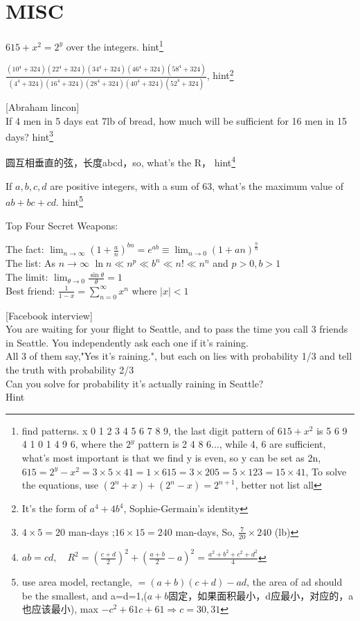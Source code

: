 \documentclass[math.tex]{subfiles}
\begin{document}
\section{MISC}

\dotfill
$615+x^2=2^y$ over the integers.  hint\footnote{find patterns. x 0 1 2 3 4 5 6 7 8 9, the last digit pattern of $615+x^2$ is 5 6 9 4 1 0 1 4 9 6, where the $2^y$ pattern is 2 4 8 6..., while 4, 6 are sufficient, what's most important is that we find y is even, so y can be set as 2n, $615=2^y-x^2=3\times 5 \times 41=1\times 615=3\times 205=5\times 123=15 \times 41$, To solve the equations, use $(2^n+x)+(2^n-x)=2^{n+1}$, better not list all}

\dotfill

$\frac{(10^4+324)(22^4+324)(34^4+324)(46^4+324)(58^4+324)}{(4^4+324)(16^4+324)(28^4+324)(40^4+324)(52^4+324)}$, hint\footnote{It's the form of $a^4+4b^4$, Sophie-Germain's identity}

\dotfill

[Abraham lincon]\\
If 4 men in 5 days eat 7lb of bread, how much will be sufficient for 16 men in 15 days? hint\footnote{$4\times 5=20 $ man-days ;$16\times 15=240$ man-days, So, $\frac{7}{20}\times 240$ (lb)}

\dotfill

圆互相垂直的弦，长度abcd，so, what's the R， hint\footnote{$ab=cd,\quad R^2=(\frac{c+d}{2})^2+(\frac{a+b}{2}-a)^2=\frac{a^2+b^2+c^2+d^2}{4}$}

\dotfill

If $a,b,c,d$ are positive integers, with a sum of 63, what's the maximum value of $ab+bc+cd$. hint\footnote{use area model, rectangle, $=(a+b)(c+d)-ad$, the area of ad should be the smallest, and a=d=1,($a+b$固定，如果面积最小，d应最小，对应的，a也应该最小), max $-c^2+61c+61\Rightarrow c=30,31$}

\dotfill

Top Four Secret Weapons:

The fact: $\lim_{n \to \infty}(1+\frac{a}{n})^{bn}=e^{ab} \equiv \lim_{n \to 0}(1+an)^{\frac{b}{n}}$ \\
The list: As $n \to \infty$ $\ln n \ll n^p \ll b^n \ll n! \ll n^n$ and $p > 0, b>1$  \\
The limit: $\lim_{\theta \to 0}\frac{\sin \theta}{\theta}=1$\\
Best friend: $\frac{1}{1-x}=\sum_{n=0}^{\infty}x^n$ where $|x| < 1$

\dotfill

[Facebook interview]\\
You are waiting for your flight to Seattle, and to pass the time you call 3 friends in Seattle. You independently ask each one if it's raining.\\
All 3 of them say,"Yes it's raining.", but each on lies with probability 1/3 and tell the truth with probability 2/3\\
Can you solve for probability it's actually raining in Seattle?\\
Hint
\end{document}

